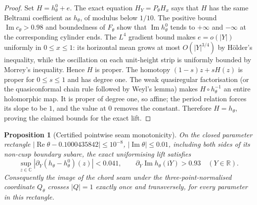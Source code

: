 \documentclass[11pt]{amsart}
\newtheorem{proposition}[theorem]{Proposition}
\theoremstyle{definition}
\newcommand{\ii}{\mathrm{i}}
\begin{document}
\begin{proof}
Set $H=h^0_\theta+e$.  The exact equation
$H_Y=P_\theta H_x$ says that $H$ has the same Beltrami
coefficient as $h_\theta$, of modulus below $1/10$.
The positive bound $\operatorname{Im}c_\theta>0.98$ and boundedness
of $F_\theta$ show that $\operatorname{Im}h^0_\theta$ tends to
$+\infty$ and $-\infty$ at the corresponding cylinder ends.
The $L^4$ gradient bound makes $e=o(|Y|)$ uniformly in
$0\le x\le1$: its horizontal mean grows at most
$O(|Y|^{3/4})$ by H\"older's inequality, while the oscillation
on each unit-height strip is uniformly bounded by Morrey's
inequality.  Hence $H$ is proper.  The homotopy
$(1-s)z+sH(z)$ is proper for $0\le s\le1$ and has degree one.
The weak quasiregular factorisation (or the quasiconformal chain
rule followed by Weyl's lemma) makes $H\circ h_\theta^{-1}$
an entire holomorphic map.  It is proper of degree one, so affine;
the period relation forces its slope to be $1$, and the value at
$0$ removes the constant.  Therefore $H=h_\theta$, proving the
claimed bounds for the exact lift.
\end{proof}

\begin{proposition}[Certified pointwise seam monotonicity]
\label{prop:exterior-seam-monotonicity}
On the closed parameter rectangle
$|\operatorname{Re}\theta-0.1000435842|\le10^{-8}$,
$|\operatorname{Im}\theta|\le0.01$, including both sides of its
non-cusp boundary subarc, the exact uniformising lift satisfies
\[
 \sup_{z\in\mathbb C}|\partial_Y(h_\theta-h^0_\theta)(z)|<0.041,
 \qquad
 \partial_Y\operatorname{Im}h_\theta(\ii Y)>0.93
 \quad(Y\in\mathbb R).
\]
Consequently the image of the chord seam under the
three-point-normalised coordinate $Q_\theta$ crosses $|Q|=1$
exactly once and transversely, for every parameter in this
rectangle.
\end{proposition}
\end{document}

